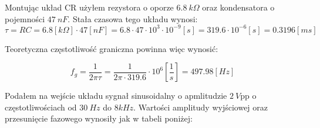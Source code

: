 \documentclass[14pt, table]{extarticle}
\begin{document}
\begin{figure}[H]
    \centering
    \qquad
\end{figure}

Montując układ CR użyłem rezystora o oporze $6.8 \ k \Omega$ oraz kondensatora o pojemności $47 \ nF$. Stała czasowa tego układu wynosi:
$$ \tau = RC = 6.8 \left[ k \Omega \right] \cdot 47 \left[ nF \right] = 6.8 \cdot 47 \cdot 10^3 \cdot 10^{-9} \left[ s \right] = 319.6 \cdot 10^{-6}  \left[ s \right] = 0.3196  \left[ ms \right] $$

Teoretyczna częstotliwość graniczna powinna więc wynosić:

$$ f_g = \frac{1}{2 \pi \tau} = \frac{1}{2 \pi \cdot 319.6} \cdot 10^{6} \left[ \frac{1}{s} \right] = 497.98  \left[ Hz \right] $$

Podałem na wejście układu sygnał sinusoidalny o apmlitudzie $2 \ V$pp o częstotliwościach od $30 \ Hz$ do $8 kHz$. Wartości amplitudy wyjściowej oraz przesunięcie fazowego wynosiły jak w tabeli poniżej: \\
\end{document}
